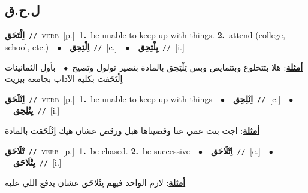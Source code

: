 \documentclass[10pt,a4paper,twoside]{article} %
\begin{document}
\begin{multicols}{2}
\vspace{-3mm}
\subsection*{\color{blue}\foreignlanguage{arabic}{ل.ح.ق}\color{blue}{}} 

{\setlength\topsep{0pt}\textbf{\foreignlanguage{arabic}{اِلْتَحَق}}\ {\color{gray}\texttt{//}\color{black}}\ \textsc{verb}\ [p.]\ \textbf{1.}~be unable to keep up with things.  \textbf{2.}~attend (college, school, etc.)\ \ $\bullet$\ \ \setlength\topsep{0pt}\textbf{\foreignlanguage{arabic}{اِلْتِحِق}}\ {\color{gray}\texttt{//}\color{black}}\ [c.]\ \ $\bullet$\ \ \setlength\topsep{0pt}\textbf{\foreignlanguage{arabic}{يِلْتِحِق}}\ {\color{gray}\texttt{//}\color{black}}\ [i.]\  \begin{flushright}\color{gray}\foreignlanguage{arabic}{\textbf{\underline{\foreignlanguage{arabic}{أمثلة}}}: هلا بتتخلوع وبتتمايص وبس تِلْتِحِق بالمادة بتصير تولول وتصيح\ $\bullet$\ \  بأول الثمانينات اِلْتَحَقت بكلية الآداب بجامعة بيزيت}\end{flushright}\color{black}} \vspace{2mm}

{\setlength\topsep{0pt}\textbf{\foreignlanguage{arabic}{اِنْلَحَق}}\ {\color{gray}\texttt{//}\color{black}}\ \textsc{verb}\ [p.]\ \textbf{1.}~be unable to keep up with things\ \ $\bullet$\ \ \setlength\topsep{0pt}\textbf{\foreignlanguage{arabic}{اِنْلِحِق}}\ {\color{gray}\texttt{//}\color{black}}\ [c.]\ \ $\bullet$\ \ \setlength\topsep{0pt}\textbf{\foreignlanguage{arabic}{يِنْلِحِق}}\ {\color{gray}\texttt{//}\color{black}}\ [i.]\  \begin{flushright}\color{gray}\foreignlanguage{arabic}{\textbf{\underline{\foreignlanguage{arabic}{أمثلة}}}: اجت بنت عمي عنا وقضيناها هبل ورقص عشان هيك اِنْلَحَقت بالمادة}\end{flushright}\color{black}} \vspace{2mm}

{\setlength\topsep{0pt}\textbf{\foreignlanguage{arabic}{تْلَاحَق}}\ {\color{gray}\texttt{//}\color{black}}\ \textsc{verb}\ [p.]\ \textbf{1.}~be chased.  \textbf{2.}~be successive\ \ $\bullet$\ \ \setlength\topsep{0pt}\textbf{\foreignlanguage{arabic}{اِتْلَاحَق}}\ {\color{gray}\texttt{//}\color{black}}\ [c.]\ \ $\bullet$\ \ \setlength\topsep{0pt}\textbf{\foreignlanguage{arabic}{يِتْلَاحَق}}\ {\color{gray}\texttt{//}\color{black}}\ [i.]\  \begin{flushright}\color{gray}\foreignlanguage{arabic}{\textbf{\underline{\foreignlanguage{arabic}{أمثلة}}}: لازم الواحد فيهم يِتْلاحَق عشان يدفع اللي عليه}\end{flushright}\color{black}} \vspace{2mm}


\end{multicols}
\end{document}
